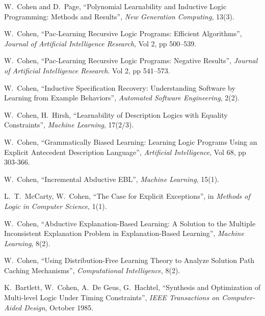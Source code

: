 \item[1995] W.~Cohen and D.~Page, ``Polynomial Learnability 
		and Inductive Logic Programming: Methods and Results'', 
		{\it New Generation Computing}, 13(3).

\item[1995] W.~Cohen, ``Pac-Learning Recursive Logic
		Programs: Efficient Algorithms'', {\it
		Journal of Artificial Intelligence Research},
		Vol 2, pp 500--539.

\item[1995] W.~Cohen, ``Pac-Learning Recursive Logic
		Programs: Negative Results'', {\it
		Journal of Artificial Intelligence Research}.
		Vol 2, pp 541--573.

\item[1995] W.~Cohen, ``Inductive Specification Recovery: 
		Understanding Software by Learning from Example Behaviors'',
		{\it Automated Software Engineering},
		2(2).

\item[1994] W.~Cohen, H.~Hirsh, ``Learnability of Description Logics
		with Equality Constraints'', 
		{\em Machine Learning\/}, 17(2/3).

\item[1994] 	W.~Cohen, ``Grammatically Biased Learning:
		Learning Logic Programs Using an Explicit 
		Antecedent Description Language'', 
		{\em Artificial Intelligence}, Vol 68, pp 303-366.

\item[1994] 	W.~Cohen, ``Incremental Abductive EBL'', 
		{\em Machine Learning\/}, 15(1).  

\item[1994]     L.~T.~McCarty, W.~Cohen, ``The Case for Explicit
		Exceptions'', in {\em Methods of
		Logic in Computer Science}, 1(1).

\item[1992] 	W.~Cohen, ``Abductive Explanation-Based Learning:
		A Solution to the Multiple Inconsistent Explanation
		Problem in Explanation-Based Learning'', 
		{\em Machine Learning}, 8(2).

\item[1992] 	W.~Cohen, ``Using Distribution-Free Learning Theory
		to Analyze Solution Path Caching Mechanisms'',
		{\em Computational Intelligence}, 8(2).

\item[1986]	K.~Bartlett, W.~Cohen, A.~De Geus, G.~Hachtel,
		``Synthesis and Optimization of Multi-level Logic
		Under Timing Constraints'', {\em IEEE Transactions on
		Computer-Aided Design}, October 1985. 

